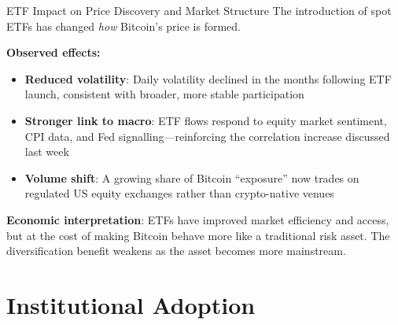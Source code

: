 \documentclass[10pt]{beamer}
\begin{document}
\begin{frame}{ETF Impact on Price Discovery and Market Structure}
  The introduction of spot ETFs has changed \textit{how} Bitcoin's price is formed.
  
  \vspace{0.5em}
  \textbf{Observed effects:}
  \begin{itemize}
    \item \textbf{Reduced volatility}: Daily volatility declined in the months following ETF launch, consistent with broader, more stable participation
    \item \textbf{Stronger link to macro}: ETF flows respond to equity market sentiment, CPI data, and Fed signalling---reinforcing the correlation increase discussed last week
    \item \textbf{Volume shift}: A growing share of Bitcoin ``exposure'' now trades on regulated US equity exchanges rather than crypto-native venues
  \end{itemize}
  
  \vspace{0.5em}
  \textbf{Economic interpretation}: ETFs have improved market efficiency and access, but at the cost of making Bitcoin behave more like a traditional risk asset. The diversification benefit weakens as the asset becomes more mainstream.
\end{frame}

\section{Institutional Adoption}
\end{document}
